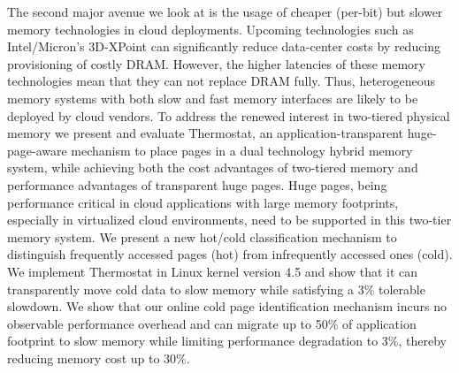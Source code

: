 The second major avenue we look at is the usage of cheaper (per-bit) but slower
memory technologies in cloud deployments. Upcoming technologies such as
Intel/Micron's 3D-XPoint can significantly reduce data-center costs by reducing
provisioning of costly DRAM. However, the higher latencies of these memory
technologies mean that they can not replace DRAM fully. Thus, heterogeneous
memory systems with both slow and fast memory interfaces are likely to be
deployed by cloud vendors. To address the renewed interest in two-tiered
physical memory we present and evaluate Thermostat, an application-transparent
huge-page-aware mechanism to place pages in a dual technology hybrid memory
system, while achieving both the cost advantages of two-tiered memory and
performance advantages of transparent huge pages. Huge pages, being performance
critical in cloud applications with large memory footprints, especially in
virtualized cloud environments, need to be supported in this two-tier memory
system. We present a new hot/cold classification mechanism to distinguish
frequently accessed pages (hot) from infrequently accessed ones (cold).  We
implement Thermostat in Linux kernel version 4.5 and show that it can
transparently move cold data to slow memory while satisfying a 3\% tolerable
slowdown. We show that our online cold page identification mechanism incurs no
observable performance overhead and can migrate up to 50\% of application
footprint to slow memory while limiting performance degradation to 3\%, thereby
reducing memory cost up to 30\%.

%
%
